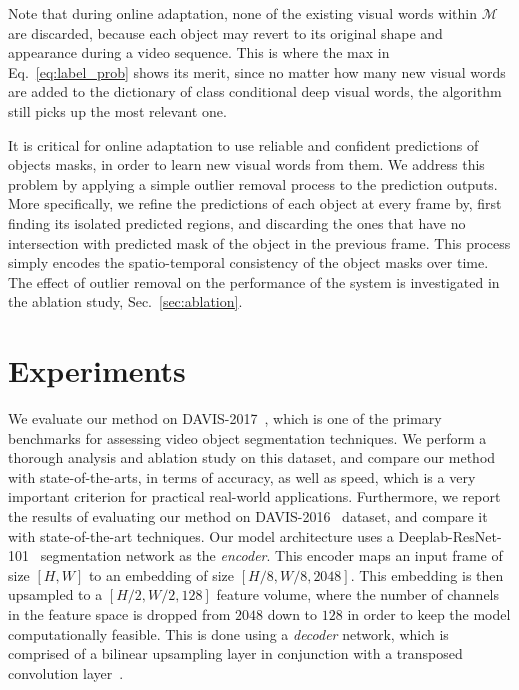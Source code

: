 \documentclass[10pt,twocolumn,letterpaper]{article}
\newcommand{\HB}[1]{{\color{blue}{HB: #1}}} %
\begin{document}
Note that during online adaptation, none of the existing visual words within $\mathcal{M}$ are discarded, because each object may revert to its original shape and appearance during a video sequence. This is where the max in Eq.~\ref{eq:label_prob} shows its merit, since no matter how many new visual words are added to the dictionary of class conditional deep visual words, the algorithm still picks up the most relevant one.

It is critical for online adaptation to use reliable and confident predictions of objects masks, in order to learn new visual words from them.
We address this problem by applying a simple outlier removal process to the prediction outputs. More specifically, we refine the predictions of each object at every frame by, first finding its isolated predicted regions, and discarding the ones that have no intersection with predicted mask of the object in the previous frame. This process simply encodes the spatio-temporal consistency of the object masks over time. The effect of outlier removal on the performance of the system is investigated in the ablation study, Sec.~\ref{sec:ablation}. %
%
\section{Experiments}\label{sec:exp}
We evaluate our method on DAVIS-2017~\cite{davis_2017}, which is one of the primary benchmarks for assessing video object segmentation techniques. We perform a thorough analysis and ablation study on this dataset, and compare our method with state-of-the-arts, in terms of accuracy, as well as speed, which is a very important criterion for practical real-world applications. Furthermore, we report the results of evaluating our method on DAVIS-2016~\cite{DAVIS} dataset, and compare it with state-of-the-art techniques. 
Our model architecture uses a Deeplab-ResNet-101~\cite{deeplab} segmentation network as the {\it encoder}. This encoder maps an input frame of size $[H,W]$ to an embedding of size $[H/8, W/8, 2048]$. This embedding is then upsampled to a $[H/2, W/2, 128]$ feature volume, where the number of channels in the feature space is dropped from $2048$ down to $128$ in order to keep the model computationally feasible. This is done using a {\it decoder} network, which is comprised of a bilinear upsampling layer in conjunction with a transposed convolution layer~\cite{dumoulin2016guide}.
\end{document}
